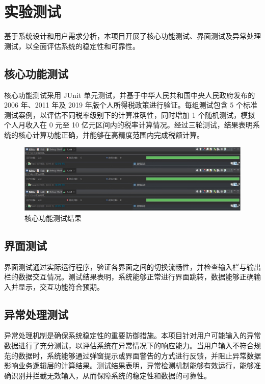 \documentclass[a4paper, utf8]{ctexart}
\begin{document}
    \section{实验测试}

    基于系统设计和用户需求分析，本项目开展了核心功能测试、界面测试及异常处理测试，以全面评估系统的稳定性和可靠性。

    \subsection{核心功能测试}

    核心功能测试采用 JUnit 单元测试，并基于中华人民共和国中央人民政府发布的 2006 年、2011 年及 2019 年版个人所得税政策进行验证。每组测试包含 5 个标准测试案例，以评估不同税率级别下的计算准确性，同时增加 1 个随机测试，模拟个人月收入在 0 元至 10 亿元区间内的税率计算情况。经过三轮测试，结果表明系统的核心计算功能正确，并能够在高精度范围内完成税额计算。

    \begin{figure}[htbp]
        \centering
        \includegraphics[width=0.95\linewidth]{figure/FunctionTest.png}
        \caption{核心功能测试结果}
    \end{figure}

    \subsection{界面测试}

    界面测试通过实际运行程序，验证各界面之间的切换流畅性，并检查输入栏与输出栏的数据交互情况。测试结果表明，系统能够正常进行界面跳转，数据能够正确输入并显示，交互功能符合预期。

    \subsection{异常处理测试}

    异常处理机制是确保系统稳定性的重要防御措施。本项目针对用户可能输入的异常数据进行了充分测试，以评估系统在异常情况下的响应能力。当用户输入不符合规范的数据时，系统能够通过弹窗提示或界面警告的方式进行反馈，并阻止异常数据影响业务逻辑层的计算结果。测试结果表明，异常检测机制能够有效运行，能够准确识别并拦截无效输入，从而保障系统的稳定性和数据的可靠性。
\end{document}
